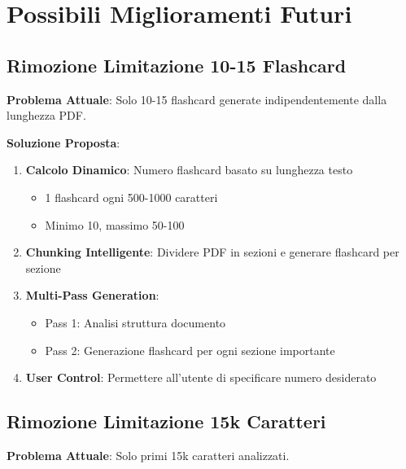\documentclass[11pt,a4paper]{article}
\begin{document}
\section{Possibili Miglioramenti Futuri}

\subsection{Rimozione Limitazione 10-15 Flashcard}

\textbf{Problema Attuale}: Solo 10-15 flashcard generate indipendentemente dalla lunghezza PDF.

\textbf{Soluzione Proposta}:
\begin{enumerate}
    \item \textbf{Calcolo Dinamico}: Numero flashcard basato su lunghezza testo
        \begin{itemize}
            \item 1 flashcard ogni 500-1000 caratteri
            \item Minimo 10, massimo 50-100
        \end{itemize}
    \item \textbf{Chunking Intelligente}: Dividere PDF in sezioni e generare flashcard per sezione
    \item \textbf{Multi-Pass Generation}: 
        \begin{itemize}
            \item Pass 1: Analisi struttura documento
            \item Pass 2: Generazione flashcard per ogni sezione importante
        \end{itemize}
    \item \textbf{User Control}: Permettere all'utente di specificare numero desiderato
\end{enumerate}

\subsection{Rimozione Limitazione 15k Caratteri}

\textbf{Problema Attuale}: Solo primi 15k caratteri analizzati.
\end{document}
